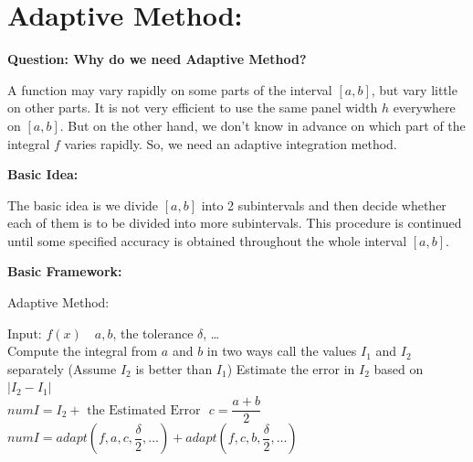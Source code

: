 \documentclass [9 pt]{article}
\theoremstyle{definition}
\begin{document}
\newpage
\section*{Adaptive Method:}
\textbf{Question: Why do we need Adaptive Method?}
\begin{mdframed}
	A function may vary rapidly on some parts of the interval $[a, b]$, but vary little on other parts. It is not very efficient to use the same panel width $h$ everywhere on $[a, b]$. But on the other hand, we don't know in advance on which part of the integral $f$ varies rapidly. So, we need an adaptive integration method.
\end{mdframed}

\textbf{Basic Idea:}
\begin{mdframed}
	The basic idea is we divide $[a, b]$ into 2 subintervals and then decide whether each of them is to be divided into more subintervals. This procedure is continued until some specified accuracy is obtained throughout the whole interval $[a, b]$.
\end{mdframed}

\textbf{Basic Framework:}
\begin{algorithm}
\caption{Adaptive Method:}
\begin{algorithmic}[1]
\State Input: $f(x)\quad a, b$, \quad the tolerance $\delta$, \ldots
	\\
	\State Compute the integral from $a$ and $b$ in two ways
	\State call the values $I_1$ and $I_2$ separately (Assume $I_2$ is better than $I_1$)
	\State Estimate the error in $I_2$ based on $|I_2 - I_1|$
	\\
		\State $numI = I_2 + \text{ the Estimated Error }$
	\Else
		\State $c = \dfrac{a + b}{2}$
		\State $numI = adapt(f, a, c, \dfrac{\delta}{2}, \ldots) + adapt(f, c, b, \dfrac{\delta}{2}, \ldots )$
	\EndIf
\end{algorithmic}
\end{algorithm}




\newpage
\end{document}
